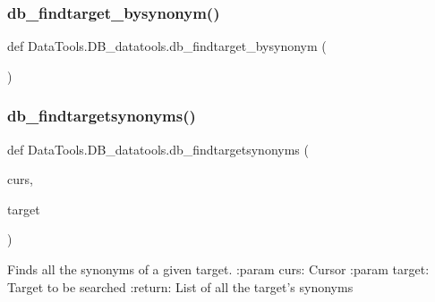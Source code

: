 \subsubsection{\texorpdfstring{db\+\_\+findtarget\+\_\+bysynonym()}{db\_findtarget\_bysynonym()}}
{\footnotesize\ttfamily def Data\+Tools.\+D\+B\+\_\+datatools.\+db\+\_\+findtarget\+\_\+bysynonym (\begin{DoxyParamCaption}{ }\end{DoxyParamCaption})}

\mbox{\label{namespace_data_tools_1_1_d_b__datatools_adace12ff97f1c03f8beac9f2c3853972}} 
\subsubsection{\texorpdfstring{db\+\_\+findtargetsynonyms()}{db\_findtargetsynonyms()}}
{\footnotesize\ttfamily def Data\+Tools.\+D\+B\+\_\+datatools.\+db\+\_\+findtargetsynonyms (\begin{DoxyParamCaption}\item[{}]{curs,  }\item[{}]{target }\end{DoxyParamCaption})}

\begin{DoxyVerb}Finds all the synonyms of a given target.
:param curs: Cursor
:param target: Target to be searched
:return: List of all the target's synonyms
\end{DoxyVerb}
 